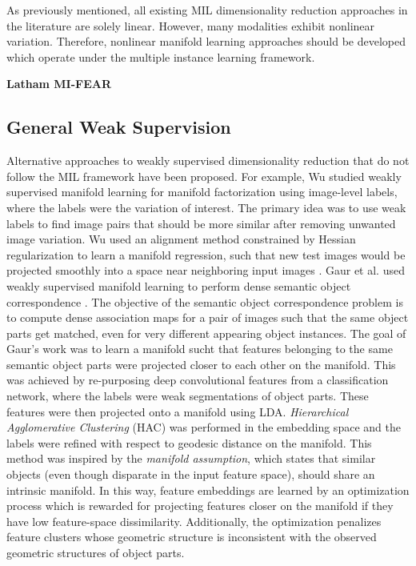 As previously mentioned, all existing MIL dimensionality reduction approaches in the literature are solely linear.  However, many modalities exhibit nonlinear variation.  Therefore, nonlinear manifold learning approaches should be developed which operate under the multiple instance learning framework. 


\textbf{Latham MI-FEAR}

\subsection{General Weak Supervision}
Alternative approaches to weakly supervised dimensionality reduction that do not follow the MIL framework have been proposed.  For example, Wu studied weakly supervised manifold learning for manifold factorization using image-level labels, where the labels were the variation of interest.  The primary idea was to use weak labels to find image pairs that should be more similar after removing unwanted image variation.  Wu used an alignment method constrained by Hessian regularization to learn a manifold regression, such that new test images would be projected smoothly into a space near neighboring input images \citep{Wu2015MILImageManifoldThesis}.  Gaur et al. used weakly supervised manifold learning to perform dense semantic object correspondence \citep{Gaur2017MILSemanticObjectCorrespondence}. The objective of the semantic object correspondence problem is to compute dense association maps for a pair of images such that the same object parts get matched, even for very different appearing object instances. The goal of Gaur's work was to learn a manifold sucht that features belonging to the same semantic object parts were projected closer to each other on the manifold. This was achieved by re-purposing deep convolutional features from a classification network, where the labels were weak segmentations of object parts.  These features were then projected onto a manifold using LDA. \textit{Hierarchical Agglomerative Clustering} (HAC) was performed in the embedding space and the labels were refined with respect to geodesic distance on the manifold.  This method was inspired by the \textit{manifold assumption}, which states that similar objects (even though disparate in the input feature space), should share an intrinsic manifold.  In this way, feature embeddings are learned by an optimization process which is rewarded for projecting features closer on the manifold if they have low feature-space dissimilarity.  Additionally, the optimization penalizes feature clusters whose geometric structure is inconsistent with the observed geometric structures of object parts.  

